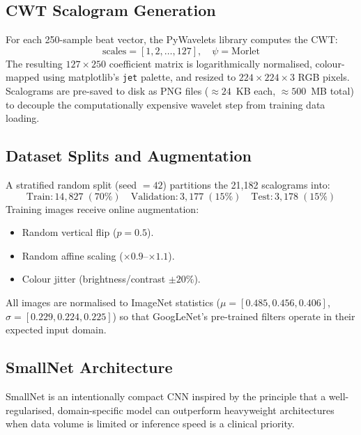 \documentclass[12pt,a4paper]{article}
\begin{document}
\subsection{CWT Scalogram Generation}

For each 250-sample beat vector, the PyWavelets library computes the CWT:
\begin{equation}
    \text{scales} = [1, 2, \ldots, 127], \quad \psi = \text{Morlet}
\end{equation}
The resulting $127 \times 250$ coefficient matrix is logarithmically normalised,
colour-mapped using matplotlib's \texttt{jet} palette, and resized to
$224 \times 224 \times 3$ RGB pixels.  Scalograms are pre-saved to disk as PNG
files ($\approx 24$~KB each, $\approx 500$~MB total) to decouple the
computationally expensive wavelet step from training data loading.

\subsection{Dataset Splits and Augmentation}

A stratified random split (seed $= 42$) partitions the 21,182 scalograms
into:
\[
    \text{Train}: 14{,}827 \;(70\%) \quad
    \text{Validation}: 3{,}177 \;(15\%) \quad
    \text{Test}: 3{,}178 \;(15\%)
\]
Training images receive online augmentation:
\begin{itemize}[leftmargin=*]
    \item Random vertical flip ($p = 0.5$).
    \item Random affine scaling ($\times 0.9$--$\times 1.1$).
    \item Colour jitter (brightness/contrast $\pm 20\%$).
\end{itemize}
All images are normalised to ImageNet statistics
($\mu = [0.485, 0.456, 0.406]$, $\sigma = [0.229, 0.224, 0.225]$) so that
GoogLeNet's pre-trained filters operate in their expected input domain.

\subsection{SmallNet Architecture}

SmallNet is an intentionally compact CNN inspired by the principle that a
well-regularised, domain-specific model can outperform heavyweight architectures
when data volume is limited or inference speed is a clinical priority.
\end{document}

